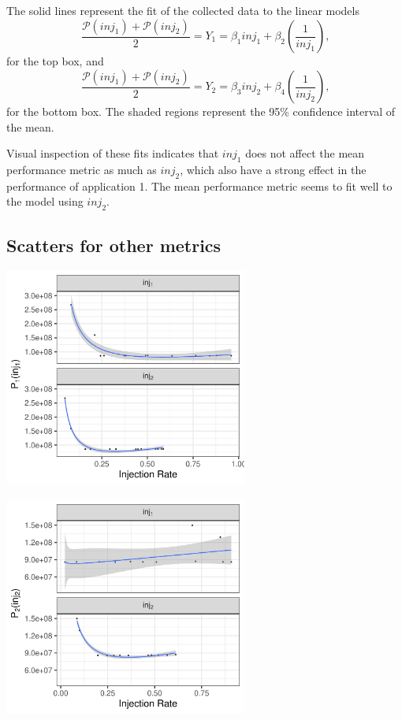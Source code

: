 \documentclass[a4paper]{article}
\begin{document}
The solid lines represent the fit of the collected data to the linear models
\begin{equation*}
\dfrac{\mathcal{P}(inj_1) + \mathcal{P}(inj_2)}{2} =
Y_1 = \beta_{1}inj_1 +
\beta_{2}\left(\dfrac{1}{inj_1}\right)\text{,}
\end{equation*}
for the top box, and
\begin{equation*}
\dfrac{\mathcal{P}(inj_1) + \mathcal{P}(inj_2)}{2} =
Y_2 = \beta_{3}inj_2 +
\beta_{4}\left(\dfrac{1}{inj_2}\right)\text{,}
\end{equation*}
for the bottom box. The shaded  regions represent the 95\% confidence interval of
the mean.

Visual inspection of  these fits indicates that \(inj_1\) does  not affect the mean
performance metric  as much as  \(inj_2\), which also have  a strong effect  in the
performance of application  1. The mean performance metric seems  to fit well to
the model using \(inj_2\).

\subsection{Scatters for other metrics}
\label{sec:org5031451}
\begin{center}
\includegraphics[width=0.6\textwidth]{./img/2_apps_min_mean_time/rs_20_samples_10_iterations_scatter_app1_weighted_full.pdf}
\end{center}

\begin{center}
\includegraphics[width=0.6\textwidth]{./img/2_apps_min_mean_time/rs_20_samples_10_iterations_scatter_app2_weighted_full.pdf}
\end{center}
\end{document}
